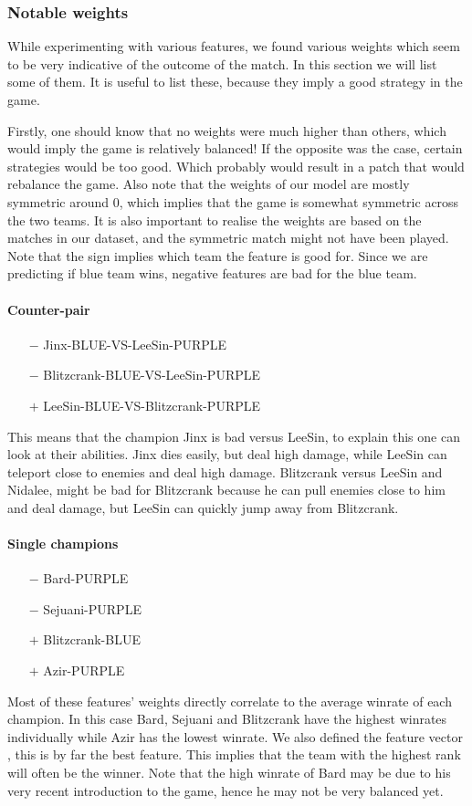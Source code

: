 \subsubsection{Notable weights}
While experimenting with various features, we found various weights which seem to be very indicative of the outcome of the match. In this section we will list some of them. It is useful to list these, because they imply a good strategy in the game.

Firstly, one should know that no weights were much higher than others, which would imply the game is relatively balanced! If the opposite was the case, certain strategies would be too good. Which probably would result in a patch that would rebalance the game. Also note that the weights of our model are mostly symmetric around 0, which implies that the game is somewhat symmetric across the two teams. It is also important to realise the weights are based on the matches in our dataset, and the symmetric match might not have been played. 
Note that the sign implies which team the feature is good for. Since we are predicting if blue team wins, negative features are bad for the blue team. 

\paragraph{Counter-pair} 
\begin{itemize}
    \item[$-$] Jinx-BLUE-VS-LeeSin-PURPLE 
    \item[$-$] Blitzcrank-BLUE-VS-LeeSin-PURPLE 
    \item[$+$] LeeSin-BLUE-VS-Blitzcrank-PURPLE 
\end{itemize} 
This means that the champion Jinx is bad versus LeeSin, to explain this one can look at their abilities. Jinx dies easily, but deal high damage, while LeeSin can teleport close to enemies and deal high damage. Blitzcrank versus LeeSin and Nidalee, might be bad for Blitzcrank because he can pull enemies close to him and deal damage, but LeeSin can quickly jump away from Blitzcrank.

\paragraph{Single champions} 
\begin{itemize}
    \item[$-$] Bard-PURPLE
    \item[$-$] Sejuani-PURPLE
    \item[$+$] Blitzcrank-BLUE
    \item[$+$] Azir-PURPLE
\end{itemize}

Most of these features' weights directly correlate to the average winrate of each champion. In this case Bard, Sejuani and Blitzcrank have the highest winrates individually while Azir has the lowest winrate. We also defined the feature vector , this is by far the best feature. This implies that the team with the highest rank will often be the winner. Note that the high winrate of Bard may be due to his very recent introduction to the game, hence he may not be very balanced yet.